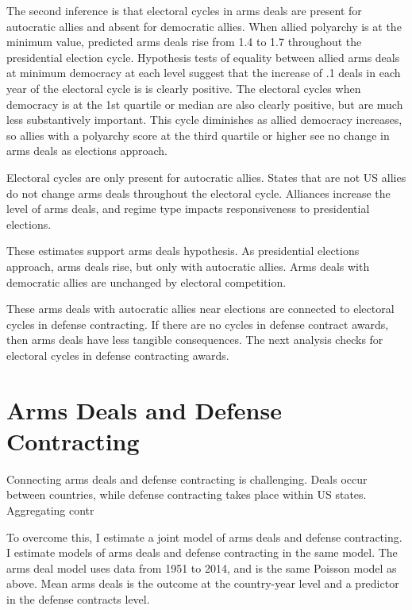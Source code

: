 \documentclass[12pt]{article}
\begin{document}
The second inference is that electoral cycles in arms deals are present for autocratic allies and absent for democratic allies.
When allied polyarchy is at the minimum value, predicted arms deals rise from 1.4 to 1.7 throughout the presidential election cycle.
Hypothesis tests of equality between allied arms deals at minimum democracy at each level suggest that the increase of .1 deals in each year of the electoral cycle is is clearly positive. 
The electoral cycles when democracy is at the 1st quartile or median are also clearly positive, but are much less substantively important.
This cycle diminishes as allied democracy increases, so allies with a polyarchy score at the third quartile or higher see no change in arms deals as elections approach.  


Electoral cycles are only present for autocratic allies. 
States that are not US allies do not change arms deals throughout the electoral cycle. 
Alliances increase the level of arms deals, and regime type impacts responsiveness to presidential elections. 


These estimates support arms deals hypothesis. 
As presidential elections approach, arms deals rise, but only with autocratic allies. 
Arms deals with democratic allies are unchanged by electoral competition.


These arms deals with autocratic allies near elections are connected to electoral cycles in defense contracting. 
If there are no cycles in defense contract awards, then arms deals have less tangible consequences. 
The next analysis checks for electoral cycles in defense contracting awards. 



\section{Arms Deals and Defense Contracting}


Connecting arms deals and defense contracting is challenging. 
Deals occur between countries, while defense contracting takes place within US states. 
Aggregating contr


To overcome this, I estimate a joint model of arms deals and defense contracting. 
I estimate models of arms deals and defense contracting in the same model.
The arms deal model uses data from 1951 to 2014, and is the same Poisson model as above. 
Mean arms deals is the outcome at the country-year level and a predictor in the defense contracts level. 
\end{document}
